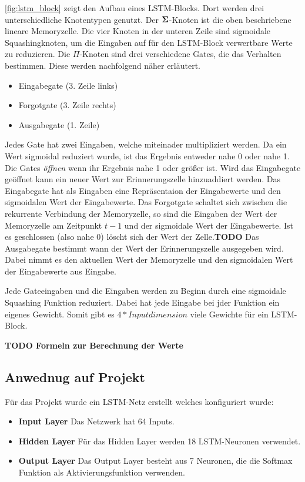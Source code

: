 \autoref{fig:lstm_block} zeigt den Aufbau eines \ac{LSTM}-Blocks. Dort werden
drei unterschiedliche Knotentypen genutzt. Der $\bf\Sigma$-Knoten ist die oben
beschriebene lineare Memoryzelle. Die vier Knoten in der unteren Zeile sind
sigmoidale Squashingknoten, um die Eingaben auf für den \ac{LSTM}-Block
verwertbare Werte zu reduzieren. Die $\Pi$-Knoten sind drei verschiedene Gates,
die das Verhalten bestimmen. Diese werden nachfolgend näher erläutert.
\begin{itemize}
	\item Eingabegate (3. Zeile links)
	\item Forgotgate (3. Zeile rechts)
	\item Ausgabegate (1. Zeile)
\end{itemize}
Jedes Gate hat zwei Eingaben, welche miteinader multipliziert werden. Da ein
Wert sigmoidal reduziert wurde, ist das Ergebnis entweder nahe 0 oder nahe 1.
Die Gates \textit{öffnen} wenn ihr Ergebnis nahe 1 oder größer ist. Wird das
Eingabegate geöffnet kann ein neuer Wert zur Erinnerungszelle hinzuaddiert
werden. Das Eingabegate hat als Eingaben eine Repräsentaion der Eingabewerte und
den sigmoidalen Wert der Eingabewerte. Das Forgotgate schaltet sich zwischen die
rekurrente Verbindung der Memoryzelle, so sind die Eingaben der Wert der
Memoryzelle am Zeitpunkt $t-1$ und der sigmoidale Wert der Eingabewerte. Ist es
geschlossen (also nahe 0) löscht sich der Wert der Zelle.\textbf{TODO} Das 
Ausgabegate bestimmt wann der Wert der Erinnerungszelle ausgegeben wird. Dabei
nimmt es den aktuellen Wert der Memoryzelle und den sigmoidalen Wert der
Eingabewerte aus Eingabe. 

Jede Gateeingaben und die Eingaben werden zu Beginn durch eine sigmoidale
Squashing Funktion reduziert. Dabei hat jede Eingabe bei jder Funktion ein
eigenes Gewicht. Somit gibt es $4*Inputdimension$ viele Gewichte für ein
\ac{LSTM}-Block. 

\textbf{TODO Formeln zur Berechnung der Werte}

\subsection{Anwednug auf Projekt}
Für das Projekt wurde ein LSTM-Netz erstellt welches konfiguriert wurde:

\begin{itemize}
\item \textbf{Input Layer} Das Netzwerk hat 64 Inputs.
\item \textbf{Hidden Layer} Für das Hidden Layer werden 18 LSTM-Neuronen verwendet.
\item \textbf{Output Layer} Das Output Layer besteht aus 7 Neuronen, die die 
Softmax Funktion als Aktivierungsfunktion verwenden.
\end{itemize}

